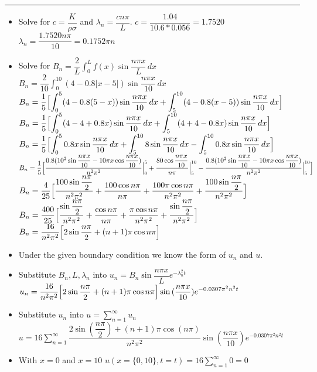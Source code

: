 \documentclass[10pt]{article}
\begin{document}
\hrule 

\vspace{7.5mm}

\begin{itemize}
    \item Solve for $ c = \dfrac{K}{\rho\sigma} $ and $ \lambda_{n} = \dfrac{cn\pi}{L} $.
    \subitem $ c = \dfrac{1.04}{10.6*0.056} = 1.7520 $
    \subitem $ \lambda_{n} = \dfrac{1.7520n\pi}{10} = 0.1752\pi n $
    \item Solve for $ \displaystyle B_{n} = \dfrac{2}{L} \int_{0}^{L} f(x) \sin{\dfrac{n\pi x}{L}} \,dx $
    \subitem $ \displaystyle B_{n} = \dfrac{2}{10} \int_{0}^{10} (4 - 0.8|x-5|) \sin{\dfrac{n\pi x}{10}} \,dx $
    \subitem $ \displaystyle B_{n} = \dfrac{1}{5} \Bigl[ \int_{0}^{5} (4 - 0.8(5-x)) \sin{\dfrac{n\pi x}{10}} \,dx + \int_{5}^{10} (4 - 0.8(x-5)) \sin{\dfrac{n\pi x}{10}} \,dx \Bigr] $
    \subitem $ \displaystyle B_{n} = \dfrac{1}{5} \Bigl[ \int_{0}^{5} (4 -4 + 0.8x) \sin{\dfrac{n\pi x}{10}} \,dx + \int_{5}^{10} (4 + 4 - 0.8x) \sin{\dfrac{n\pi x}{10}} \,dx \Bigr] $
    \subitem $ \displaystyle B_{n} = \dfrac{1}{5} \Bigl[ \int_{0}^{5} 0.8x\sin{\dfrac{n\pi x}{10}} \,dx + \int_{5}^{10} 8\sin{\dfrac{n\pi x}{10}} \,dx - \int_{5}^{10} 0.8x\sin{\dfrac{n\pi x}{10}} \,dx \Bigr] $
    \subitem $ \displaystyle B_{n} = \dfrac{1}{5} \Bigl[ \dfrac{0.8(10^2\sin{\dfrac{n\pi x}{10}} - 10\pi x\cos{\dfrac{n\pi x}{10}})}{n^2\pi^2} \Big|_{0}^{5} + \dfrac{80\cos{\dfrac{n\pi x}{10}}}{n\pi} \Big|_{5}^{10} - \dfrac{0.8(10^2\sin{\dfrac{n\pi x}{10}} - 10\pi x\cos{\dfrac{n\pi x}{10}})}{n^2\pi^2} \Big|_{5}^{10} \Bigr] $
    \subitem $ \displaystyle B_{n} = \dfrac{4}{25} \Bigl[ \dfrac{100\sin{\dfrac{n\pi}{2}}}{n^2\pi^2} + \dfrac{100\cos{n\pi}}{n\pi} + \dfrac{100\pi\cos{n\pi}}{n^2\pi^2} + \dfrac{100\sin{\dfrac{n\pi}{2}}}{n^2\pi^2} \Bigr] $
    \subitem $ \displaystyle B_{n} = \dfrac{400}{25} \Bigl[ \dfrac{\sin{\dfrac{n\pi}{2}}}{n^2\pi^2} + \dfrac{\cos{n\pi}}{n\pi} + \dfrac{\pi\cos{n\pi}}{n^2\pi^2} + \dfrac{\sin{\dfrac{n\pi}{2}}}{n^2\pi^2} \Bigr] $
    \subitem $ \displaystyle B_{n} = \dfrac{16}{n^2\pi^2} \Bigl[ 2\sin{\dfrac{n\pi}{2}} + (n + 1)\pi\cos{n\pi} \Bigr] $
    \item Under the given boundary condition we know the form of $ u_n $ and $ u $.
    \item Substitute $ B_{n}, L, \lambda_{n} $ into $ \displaystyle u_{n} =  B_{n}\sin{\dfrac{n\pi x}{L}}e^{-\lambda_{n}^{2}t}$
    \subitem $ \displaystyle u_{n} = \dfrac{16}{n^2\pi^2} \Bigl[ 2\sin{\dfrac{n\pi}{2}} + (n + 1)\pi\cos{n\pi} \Bigr]\sin{(\dfrac{n\pi x}{10})}e^{-0.0307\pi^2n^{2}t}$
    \item Substitute $ u_n $ into $ \displaystyle u = \sum_{n = 1}^{\infty} u_{n} $
    \subitem $ \displaystyle u = 16\sum_{n = 1}^{\infty} \dfrac{2\sin{(\dfrac{n\pi}{2})} + (n + 1)\pi\cos{(n\pi)}}{n^2\pi^2} \sin{(\dfrac{n\pi x}{10})}e^{-0.0307\pi^2n^{2}t}$
    \item With $ x = 0 $ and $ x = 10 $
    \subitem $ \displaystyle u(x=\{0,10\},t=t) = 16\sum_{n = 1}^{\infty} 0 = 0 $
\end{itemize}
\end{document}
